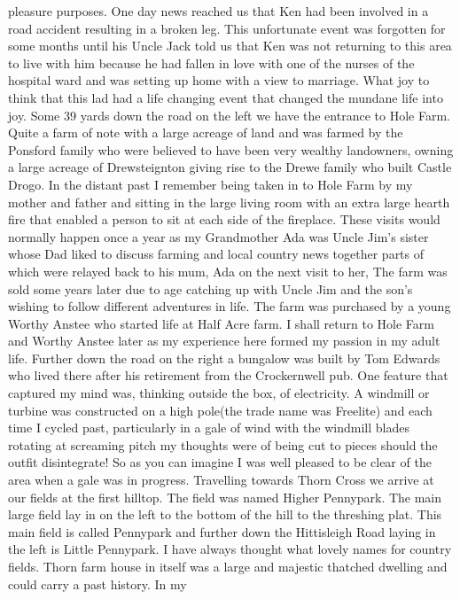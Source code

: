 pleasure purposes. One day news reached us that Ken had been involved in a road
accident resulting in a broken leg. This unfortunate event was forgotten for
some months until his Uncle Jack told us that Ken was not returning to this
area to live with him because he had fallen in love with one of the nurses of
the hospital ward and was setting up home with a view to marriage. What joy to
think that this lad had a life changing event that changed the mundane life
into joy. Some 39 yards down the road on the left we have the entrance to Hole
Farm. Quite a farm of note with a large acreage of land and was farmed by the
Ponsford family who were believed to have been very wealthy landowners, owning
a large acreage of Drewsteignton giving rise to the Drewe family who built
Castle Drogo. In the distant past I remember being taken in to Hole Farm by my
mother and father and sitting in the large living room with an extra large
hearth fire that enabled a person to sit at each side of the fireplace. These
visits would normally happen once a year as my Grandmother Ada was Uncle Jim’s
sister whose Dad liked to discuss farming and local country news together parts
of which were relayed back to his mum, Ada on the next visit to her,  The farm
was sold some years later due to age catching up with Uncle Jim and the son’s
wishing to follow different adventures in life. The farm was purchased by a
young Worthy Anstee who started life at Half Acre farm. I shall return to Hole
Farm and Worthy Anstee later as my experience here formed my passion in my
adult life. Further down the road on the right a bungalow was built by Tom
Edwards who lived there after his retirement from the Crockernwell pub. One
feature that captured my mind was, thinking outside the box, of electricity. A
windmill or turbine was constructed  on a  high pole(the trade name was
Freelite) and each time I cycled past, particularly in a gale of wind with  the
windmill blades rotating at screaming pitch my thoughts were of being cut to
pieces should the outfit disintegrate!  So as you can imagine I was well
pleased to be clear of the area when a gale was in progress. Travelling towards
Thorn Cross we arrive at our fields at the first hilltop. The field was named
Higher Pennypark. The main large field lay in on the left to the bottom of the
hill to the threshing plat. This main field is called Pennypark and further
down the Hittisleigh Road laying in the left is Little Pennypark. I have always
thought what lovely names for country fields. Thorn farm house in itself was a
large and majestic thatched dwelling and could carry a past history. In my

